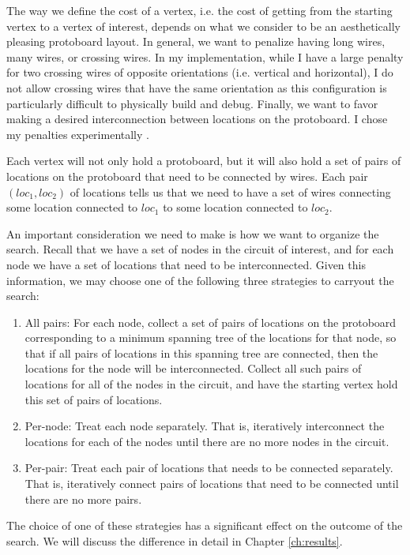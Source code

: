 The way we define the cost of a vertex, i.e. the cost of getting from the
starting vertex to a vertex of interest, depends on what we consider to be an
aesthetically pleasing protoboard layout. In general, we want to penalize having
long wires, many wires, or crossing wires. In my implementation, while I have
a large penalty for two crossing wires of opposite orientations (i.e. vertical
and horizontal), I do not allow crossing wires that have the same orientation as
this configuration is particularly difficult to physically build and debug.
Finally, we want to favor making a desired interconnection between locations
on the protoboard. I chose my penalties experimentally
\q.

Each vertex will not only hold a protoboard, but it will also hold a set of
pairs of locations on the protoboard that need to be connected by wires. Each
pair $(loc_1, loc_2)$ of locations tells us that we need to have a set of wires
connecting some location connected to $loc_1$ to some location connected to
$loc_2$.

An important consideration we need to make is how we want to organize the
search. Recall that we have a set of nodes in the circuit of interest, and for
each node we have a set of locations that need to be interconnected. Given this
information, we may choose one of the following three strategies to carryout the
search:

\begin{enumerate}
\item All pairs: For each node, collect a set of pairs of locations on the
protoboard
corresponding to a minimum spanning tree of the locations for that node, so that
if all pairs of locations in this spanning tree are connected, then the
locations for the node will be interconnected. Collect all such pairs of
locations for all of the nodes in the circuit, and have the starting vertex hold
this set of pairs of locations.
\item Per-node: Treat each node separately. That is, iteratively interconnect the
locations for each of the nodes until there are no more nodes in the circuit.
\item Per-pair: Treat each pair of locations that needs to be connected
separately. That
is, iteratively connect pairs of locations that need to be connected until there
are no more pairs.
\end{enumerate}

The choice of one of these strategies has a significant effect on the outcome of
the search. We will discuss the difference in detail in Chapter
\ref{ch:results}.

